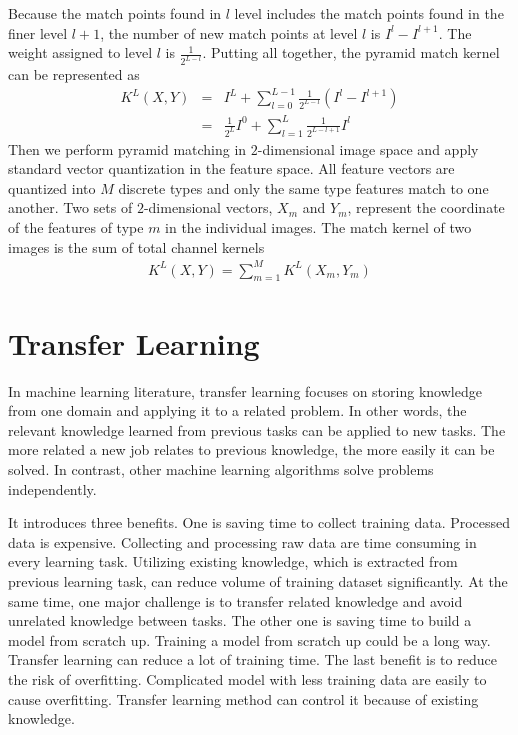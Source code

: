 Because the match points found in $l$ level includes the match points found in the finer level $l+1$, the number of new match points at level $l$ is $I^l - I^{l+1}$. The weight assigned to level $l$ is $\frac{1}{2^{L-l}}$. Putting all together, the pyramid match kernel can be represented as
\begin{eqnarray}\label{eq:PyramidChanMatchKernel}
  K^L(X,Y) & = & I^L + \sum_{l=0}^{L-1} \frac{1}{2^{L-l}}(I^l-I^{l+1})\\
 & = & \frac{1}{2^L}I^0 + \sum_{l=1}^{L}\frac{1}{2^{L-l+1}}I^l
\end{eqnarray}
Then we perform pyramid matching in $2$-dimensional image space and apply standard vector quantization in the feature space. All feature vectors are quantized into $M$ discrete types and only the same type features match to one another. Two sets of $2$-dimensional vectors, $X_m$ and $Y_m$, represent the coordinate of the features of type $m$ in the individual images. The match kernel of two images is the sum of total channel kernels
\begin{eqnarray}\label{eq:PyramidMatchKernel}
  K^L(X,Y) = \sum_{m=1}^{M} K^L(X_m, Y_m)
\end{eqnarray}

\section{Transfer Learning}

In machine learning literature, transfer learning\citep{pan2010survey} focuses on storing knowledge from one domain and applying it to a related problem. In other words, the relevant knowledge learned from previous tasks can be applied to new tasks. The more related a new job relates to previous knowledge, the more easily it can be solved. In contrast, other machine learning algorithms solve problems independently. 

It introduces three benefits. One is saving time to collect training data.  Processed data is expensive. Collecting and processing raw data are time consuming in every learning task. Utilizing existing knowledge, which is extracted from previous learning task, can reduce volume of training dataset significantly. At the same time, one major challenge is to transfer related knowledge and avoid unrelated knowledge between tasks. The other one is saving time to build a model from scratch up. Training a model from scratch up could be a long way. Transfer learning can reduce a lot of training time. The last benefit is to reduce the risk of overfitting. Complicated model with less training data are easily to cause overfitting. Transfer learning method can control it because of existing knowledge.

